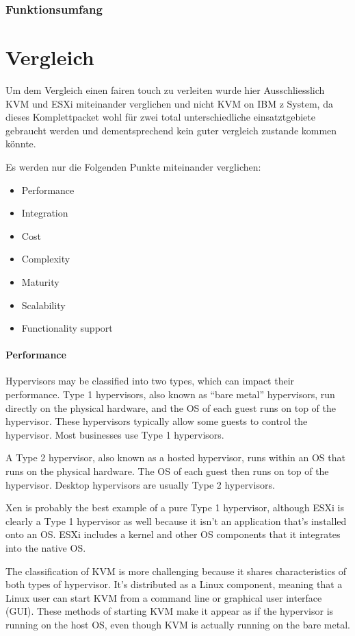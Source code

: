 \documentclass[14pt]{extreport}
\begin{document}
\subsection{Funktionsumfang}


\chapter{Vergleich}
Um dem Vergleich einen fairen touch zu verleiten wurde hier Ausschliesslich KVM und ESXi miteinander verglichen und nicht KVM on IBM z System, da dieses Komplettpacket wohl für zwei total unterschiedliche einsatztgebiete gebraucht werden und dementsprechend kein guter vergleich zustande kommen könnte.

Es werden nur die Folgenden Punkte miteinander verglichen:
\begin{itemize}
	\item	Performance
	\item	Integration
	\item	Cost
	\item	Complexity
	\item	Maturity
	\item	Scalability
	\item	Functionality support
\end{itemize}


\subsubsection{Performance}

Hypervisors may be classified into two types, which can impact their performance. Type 1 hypervisors, also known as “bare metal” hypervisors, run directly on the physical hardware, and the OS of each guest runs on top of the hypervisor. These hypervisors typically allow some guests to control the hypervisor. Most businesses use Type 1 hypervisors.

A Type 2 hypervisor, also known as a hosted hypervisor, runs within an OS that runs on the physical hardware. The OS of each guest then runs on top of the hypervisor. Desktop hypervisors are usually Type 2 hypervisors.

Xen is probably the best example of a pure Type 1 hypervisor, although ESXi is clearly a Type 1 hypervisor as well because it isn’t an application that’s installed onto an OS. ESXi includes a kernel and other OS components that it integrates into the native OS.

The classification of KVM is more challenging because it shares characteristics of both types of hypervisor. It’s distributed as a Linux component, meaning that a Linux user can start KVM from a command line or graphical user interface (GUI). These methods of starting KVM make it appear as if the hypervisor is running on the host OS, even though KVM is actually running on the bare metal.
\end{document}
